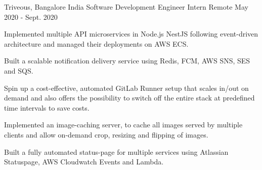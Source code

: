 

\begin{cventries}

  \cventry
    {Triveous, Bangalore India} %
    {Software Development Engineer Intern} %
    {Remote} %
    {May 2020 - Sept. 2020} %
    {
      \begin{cvitems} %
        \item {Implemented multiple API microservices in Node.js NestJS following event-driven architecture and managed their deployments on AWS ECS.}
        \item {Built a scalable notification delivery service using Redis, FCM, AWS SNS, SES and SQS.}
        \item {Spin up a cost-effective, automated GitLab Runner setup that scales in/out on demand and also offers the possibility to switch off the entire stack at predefined time intervals to save costs.}
        \item {Implemented an image-caching server, to cache all images served by multiple clients and allow on-demand crop, resizing and flipping of images.}
        \item {Built a fully automated status-page for multiple services using Atlassian Statuspage, AWS Cloudwatch Events and Lambda.}
      \end{cvitems}
    }


\end{cventries}
